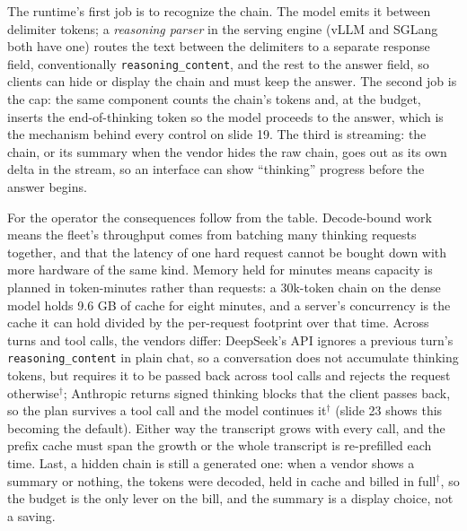 \documentclass[11pt,letterpaper]{article}
\begin{document}
The runtime's first job is to recognize the chain. The model emits it between delimiter tokens; a \emph{reasoning parser} in the serving engine (vLLM and SGLang both have one) routes the text between the delimiters to a separate response field, conventionally \texttt{reasoning\_content}, and the rest to the answer field, so clients can hide or display the chain and must keep the answer. The second job is the cap: the same component counts the chain's tokens and, at the budget, inserts the end-of-thinking token so the model proceeds to the answer, which is the mechanism behind every control on slide 19. The third is streaming: the chain, or its summary when the vendor hides the raw chain, goes out as its own delta in the stream, so an interface can show ``thinking'' progress before the answer begins.

For the operator the consequences follow from the table. Decode-bound work means the fleet's throughput comes from batching many thinking requests together, and that the latency of one hard request cannot be bought down with more hardware of the same kind. Memory held for minutes means capacity is planned in token-minutes rather than requests: a 30k-token chain on the dense model holds 9.6 GB of cache for eight minutes, and a server's concurrency is the cache it can hold divided by the per-request footprint over that time. Across turns and tool calls, the vendors differ: DeepSeek's API ignores a previous turn's \texttt{reasoning\_content} in plain chat, so a conversation does not accumulate thinking tokens, but requires it to be passed back across tool calls and rejects the request otherwise$^\dagger$; Anthropic returns signed thinking blocks that the client passes back, so the plan survives a tool call and the model continues it$^\dagger$ (slide 23 shows this becoming the default). Either way the transcript grows with every call, and the prefix cache must span the growth or the whole transcript is re-prefilled each time. Last, a hidden chain is still a generated one: when a vendor shows a summary or nothing, the tokens were decoded, held in cache and billed in full$^\dagger$, so the budget is the only lever on the bill, and the summary is a display choice, not a saving.
\end{document}
